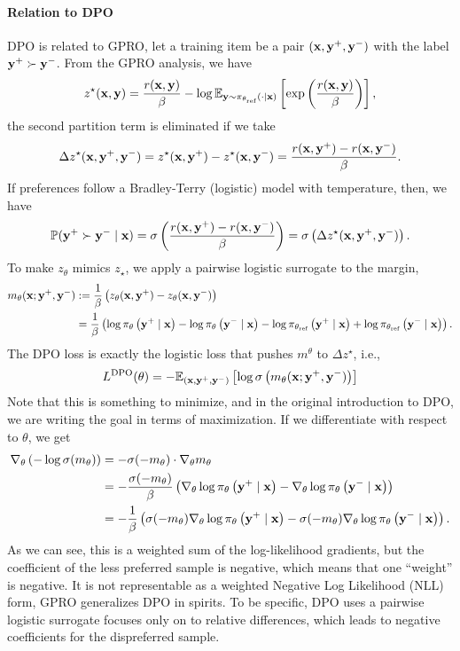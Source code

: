 \documentclass[11pt]{article}  %
\begin{document}
\paragraph{Relation to DPO}
DPO is related to GPRO, let a training item be a pair $(\mathbf{x}, \mathbf{y}^+, \mathbf{y}^-)$ with the label $\mathbf{y}^+ \succ \mathbf{y}^-$.
From the GPRO analysis, we have 
\begin{align*}
  z^\star(\mathbf{x}, \mathbf{y}) = \frac{r(\mathbf{x}, \mathbf{y})}{\beta} - \log \mathbb{E}_{\mathbf{y} \sim \pi_{\theta_{\text{ref}}}\left( \cdot \mid \mathbf{x} \right)}\left[\exp\left( \frac{r(\mathbf{x}, \mathbf{y})}{\beta} \right)\right],
\end{align*}
the second partition term is eliminated if we take 
\begin{align*}
  \Delta z^\star(\mathbf{x}, \mathbf{y}^+, \mathbf{y}^-) = z^\star(\mathbf{x}, \mathbf{y}^+) - z^\star(\mathbf{x}, \mathbf{y}^-) = \frac{r(\mathbf{x}, \mathbf{y}^+) - r(\mathbf{x}, \mathbf{y}^-)}{\beta}.
\end{align*}
If preferences follow a Bradley-Terry (logistic) model with temperature, then, we have 
\begin{align*}
  \mathbb{P}(\mathbf{y}^+ \succ \mathbf{y}^- \mid \mathbf{x}) = \sigma \left( \frac{r(\mathbf{x}, \mathbf{y}^+) - r(\mathbf{x}, \mathbf{y}^-)}{\beta} \right) = \sigma \left( \Delta z^\star(\mathbf{x}, \mathbf{y}^+, \mathbf{y}^-) \right).
\end{align*}
To make $z_{\theta}$ mimics $z_\star$, we apply a pairwise logistic surrogate to the margin, 
\begin{align*}
  m_{\theta}(\mathbf{x}; \mathbf{y}^+, \mathbf{y}^-) &:= \frac{1}{\beta}\left( z_{\theta}(\mathbf{x}, \mathbf{y}^+) - z_{\theta}(\mathbf{x}, \mathbf{y}^-) \right) \\
  &= \frac{1}{\beta}\left( \log\pi_{\theta}\left( \mathbf{y}^+ \mid \mathbf{x} \right) - \log\pi_{\theta}\left( \mathbf{y}^- \mid \mathbf{x} \right) - \log\pi_{\theta_{\text{ref}}}\left( \mathbf{y}^+ \mid \mathbf{x} \right) + \log\pi_{\theta_{\text{ref}}}\left( \mathbf{y}^- \mid \mathbf{x} \right) \right).
\end{align*}
The DPO loss is exactly the logistic loss that pushes $m^\theta$ to $\Delta z^\star$, i.e.,
\begin{align*}
  L^{\text{DPO}}(\theta) = -\mathbb{E}_{(\mathbf{x},\mathbf{y}^+, \mathbf{y}^-)}\left[\log\sigma\left( m_\theta(\mathbf{x}; \mathbf{y}^+, \mathbf{y}^-) \right)\right]
\end{align*}
Note that this is something to minimize, and in the original introduction to DPO, we are writing the goal in terms of maximization.
If we differentiate with respect to $\theta$, we get 
\begin{align*}
  \nabla_{\theta}\left(  - \log \sigma (m_\theta) \right) &= -\sigma(-m_\theta) \cdot \nabla_\theta m_\theta \\
  &= -\frac{\sigma(-m_\theta)}{\beta}\left( \nabla_\theta \log\pi_{\theta}\left( \mathbf{y}^+ \mid \mathbf{x} \right) - \nabla_\theta \log\pi_{\theta}\left( \mathbf{y}^- \mid \mathbf{x} \right) \right) \\
  &= -\frac{1}{\beta}\left( \sigma(-m_\theta)\nabla_\theta \log\pi_{\theta}\left( \mathbf{y}^+ \mid \mathbf{x} \right) - \sigma(-m_\theta)\nabla_\theta \log\pi_{\theta}\left( \mathbf{y}^- \mid \mathbf{x} \right) \right).
\end{align*}
As we can see, this is a weighted sum of the log-likelihood gradients, but the coefficient of the less preferred sample is negative, which means that one ``weight'' is negative. 
It is not representable as a weighted Negative Log Likelihood (NLL) form, GPRO generalizes DPO in spirits.
To be specific, DPO uses a pairwise logistic surrogate focuses only on to relative differences, which leads to negative coefficients for the dispreferred sample.
\end{document}

